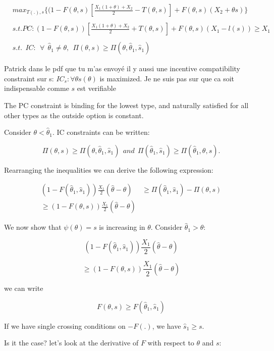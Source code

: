 \documentclass[a4paper]{article}
\renewcommand{\t}{\theta}
\begin{document}
\begin{equation}
    \begin{aligned}
    &max_{T(.),s}\{(1-F(\t,s)[\frac{X_1(1+\t)+X_2}{2}-T(\t,s)]+F(\t,s)(X_2+\t s)\}\\
    \\
    &s.t.PC: (1-F(\t,s))[\frac{X_1(1+\t)+X_2}{2}+T(\t,s)]+F(\t,s)(X_1-l(s))\geq X_1\\
    \\
    &s.t.~~IC:~~\forall~~\hat{\t}_1\neq\t,~~ \Pi(\t,s)\geq \Pi(\t, \hat{\t}_1,\hat{s}_1)
    \end{aligned}
\end{equation}

Patrick dans le pdf que tu m'as envoyé il y aussi une incentive compatibility constraint sur s: $IC_s: \forall \t s(\t)$ is maximized. Je ne suis pas sur que ca soit indispensable comme $s$ est verifiable

The PC constraint is binding for the lowest type, and naturally satisfied for all other types as the outside option is constant.


Consider $\t < \hat{\t}_1$. IC constraints can be written:

$$\Pi(\t,s)\geq \Pi(\t, \hat{\t}_1,\hat{s}_1)~~and~~\Pi(\hat{\t}_1,\hat{s}_1)\geq \Pi(\hat{\t}_1, \t,s).$$

Rearranging the inequalities we can derive the following expression:

\begin{equation}
    \begin{aligned}
    (1-F(\hat{\t}_1,\hat{s}_1))\frac{X_1}{2}(\hat{\t}-\t) &\geq \Pi(\hat{\t}_1,\hat{s}_1)-\Pi(\t,s)
    \\
    \geq (1-F(\t,s))\frac{X_1}{2}(\hat{\t}-\t)
    \end{aligned}
\end{equation}


We now show that $\psi(\t)=s$ is increasing in $\t$. Consider $\hat{\t}_1>\t$:

$$(1-F(\hat{\t}_1,\hat{s}_1))\frac{X_1}{2}(\hat{\t}-\t)$$

$$\geq (1-F(\t,s))\frac{X_1}{2}(\hat{\t}-\t)$$


we can write 

$$F(\t,s)\geq F(\hat{\t}_1,\hat{s}_1)$$

If we have single crossing conditions on $-F(.)$, we have $\hat{s}_1\geq s$.


Is it the case? let's look at the derivative of $F$ with respect to $\t$ and $s$:
\end{document}
